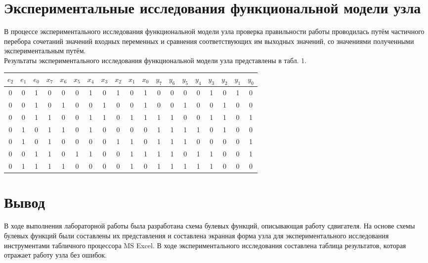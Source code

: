 \documentclass[oneside,a4paper,14pt]{extarticle}
\begin{document}
\section*{Экспериментальные исследования функциональной модели узла}
В процессе экспериментального исследования функциональной модели узла проверка правильности работы проводилась путём частичного перебора сочетаний значений входных переменных и сравнения соответствующих им выходных значений, со значениями полученными экспериментальным путём.\\
Результаты экспериментального исследования функциональной модели узла представлены в табл. 1.\\
\begin{small}

\begin{tabular}{|c|c|c|c|c|c|c|c|c|c|c|c|c|c|c|c|c|c|c|}
\hline
{$e_2$} & {$e_1$} & {$e_0$} &
{$x_7$} & {$x_6$} & {$x_5$} &
{$x_4$} & {$x_3$} & {$x_2$} &
{$x_1$} & {$x_0$} &
{$y_7$} & {$y_6$} & {$y_5$} &
{$y_4$} & {$y_3$} & {$y_2$} &
{$y_1$} & {$y_0$} \\
\hline
0 & 0 & 1 & 0 & 0 & 0 & 1 & 0 & 1 & 0 & 1 & 0 & 0 & 0 & 0 & 1 & 0 & 1 & 0 \\
\hline
0 & 0 & 1 & 0 & 1 & 0 & 0 & 1 & 0 & 0 & 1 & 0 & 0 & 1 & 0 & 0 & 1 & 0 & 0 \\
\hline
0 & 0 & 1 & 1 & 0 & 0 & 1 & 1 & 0 & 1 & 1 & 1 & 1 & 0 & 0 & 1 & 1 & 0 & 1 \\
\hline
0 & 1 & 0 & 1 & 1 & 0 & 1 & 0 & 0 & 0 & 0 & 1 & 1 & 1 & 1 & 0 & 1 & 0 & 0 \\
\hline
0 & 1 & 0 & 1 & 0 & 0 & 0 & 0 & 1 & 1 & 0 & 1 & 1 & 1 & 0 & 0 & 0 & 0 & 1 \\
\hline
0 & 0 & 1 & 1 & 0 & 1 & 1 & 0 & 0 & 1 & 1 & 1 & 1 & 0 & 1 & 1 & 0 & 0 & 1 \\
\hline
0 & 1 & 1 & 1 & 1 & 0 & 0 & 0 & 0 & 1 & 0 & 1 & 1 & 1 & 1 & 1 & 0 & 0 & 0 \\
\hline
\end{tabular}

\end{small}

\section*{Вывод}
В ходе выполнения лабораторной работы была разработана схема булевых функций, описывающая работу сдвигателя. На основе схемы булевых функций были составлены их представления и составлена экранная форма узла для экспериментального исследования инструментами табличного процессора MS Excel. В ходе экспериментального исследования составлена таблица результатов, которая отражает работу узла без ошибок.
\end{document}
